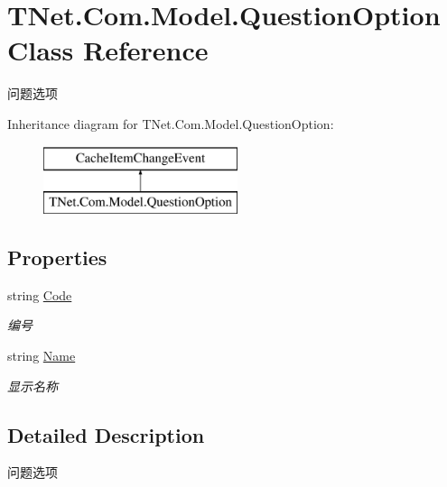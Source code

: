 \hypertarget{class_t_net_1_1_com_1_1_model_1_1_question_option}{}\section{T\+Net.\+Com.\+Model.\+Question\+Option Class Reference}
\label{class_t_net_1_1_com_1_1_model_1_1_question_option}


问题选项  


Inheritance diagram for T\+Net.\+Com.\+Model.\+Question\+Option\+:\begin{figure}[H]
\begin{center}
\leavevmode
\includegraphics[height=2.000000cm]{class_t_net_1_1_com_1_1_model_1_1_question_option}
\end{center}
\end{figure}
\subsection*{Properties}
\begin{DoxyCompactItemize}
\item 
string \mbox{\hyperlink{class_t_net_1_1_com_1_1_model_1_1_question_option_a21c9d58c1e51baf4c03b25b1918092af}{Code}}
\begin{DoxyCompactList}\small\item\em 编号 \end{DoxyCompactList}\item 
string \mbox{\hyperlink{class_t_net_1_1_com_1_1_model_1_1_question_option_a17f59011254746f334ce710ec4a9cd3b}{Name}}
\begin{DoxyCompactList}\small\item\em 显示名称 \end{DoxyCompactList}\end{DoxyCompactItemize}


\subsection{Detailed Description}
问题选项 



